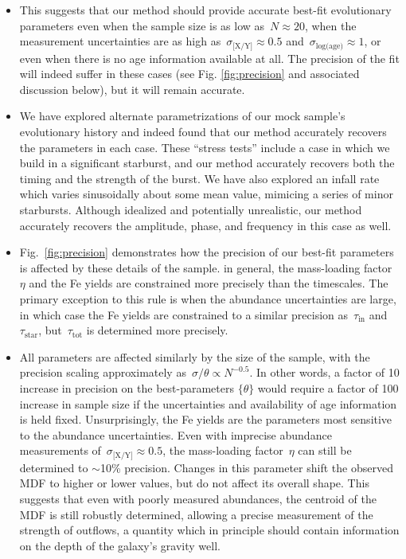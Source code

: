 \documentclass[ms.tex]{subfiles}
\begin{document}
\begin{itemize}
	\item This suggests that our method should provide accurate best-fit
	evolutionary parameters even when the sample size is as low
	as~$N \approx 20$, when the measurement uncertainties are as high
	as~$\sigma_\text{[X/Y]} \approx 0.5$ and~$\sigma_\text{log(age)} \approx 1$,
	or even when there is no age information available at all.
	The precision of the fit will indeed suffer in these cases (see Fig.
	\ref{fig:precision} and associated discussion below), but it will remain
	accurate.

	\item We have explored alternate parametrizations of our mock sample's
	evolutionary history and indeed found that our method accurately recovers
	the parameters in each case.
	These ``stress tests'' include a case in which we build in a significant
	starburst, and our method accurately recovers both the timing and the
	strength of the burst.
	We have also explored an infall rate which varies sinusoidally about some
	mean value, mimicing a series of minor starbursts.
	Although idealized and potentially unrealistic, our method accurately
	recovers the amplitude, phase, and frequency in this case as well.

	\item Fig.~\ref{fig:precision} demonstrates how the precision of our
	best-fit parameters is affected by these details of the sample.
	in general, the mass-loading factor~$\eta$ and the Fe yields are
	constrained more precisely than the timescales.
	The primary exception to this rule is when the abundance uncertainties are
	large, in which case the Fe yields are constrained to a similar precision
	as~$\tau_\text{in}$ and~$\tau_\text{star}$, but~$\tau_\text{tot}$ is
	determined more precisely.

	\item All parameters are affected similarly by the size of the sample, with
	the precision scaling approximately as~$\sigma/\theta \propto N^{-0.5}$.
	In other words, a factor of 10 increase in precision on the best-parameters
	$\{\theta\}$ would require a factor of 100 increase in sample size if the
	uncertainties and availability of age information is held fixed.
	Unsurprisingly, the Fe yields are the parameters most sensitive to the
	abundance uncertainties.
	Even with imprecise abundance measurements of~$\sigma_\text{[X/Y]}
	\approx 0.5$, the mass-loading factor~$\eta$ can still be determined to
	$\sim$10\% precision.
	Changes in this parameter shift the observed MDF to higher or lower values,
	but do not affect its overall shape.
	This suggests that even with poorly measured abundances, the centroid of
	the MDF is still robustly determined, allowing a precise measurement of the
	strength of outflows, a quantity which in principle should contain
	information on the depth of the galaxy's gravity well.


\end{itemize}
\end{document}
